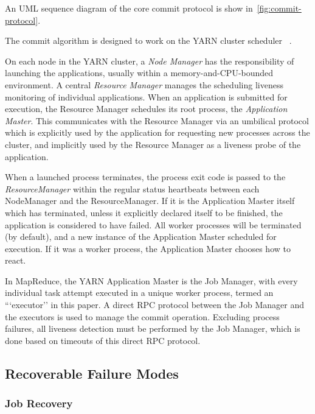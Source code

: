 \documentclass[conference]{IEEEtran}
\begin{document}
An UML sequence diagram of the core commit protocol is
show in\ \ref{fig:commit-protocol}.

The commit algorithm is designed to work on the YARN cluster scheduler
\ \cite{Vavilapalli2013}.

On each node in the YARN cluster, a \emph{Node Manager} has the responsibility
of launching the applications, usually within a memory-and-CPU-bounded
environment.
A central \emph{Resource Manager} manages the scheduling liveness monitoring
of individual applications.
When an application is submitted for execution, the Resource Manager schedules
its root process, the \emph{Application Master}.
This communicates with the Resource Manager via an umbilical protocol
which is explicitly used by the application for requesting new processes
across the cluster, and implicitly used by the Resource Manager
as a liveness probe of the application.

When a launched process terminates, the process exit code
is passed to the \emph{ResourceManager} within the regular status heartbeats
between each NodeManager and the ResourceManager.
If it is the Application Master itself which has terminated, unless it explicitly
declared itself to be finished, the application is considered to have failed.
All worker processes will be terminated (by default), and a new instance
of the Application Master scheduled for execution.
If it was a worker process, the Application Master chooses how to    react.


In MapReduce, the YARN Application Master is the Job Manager,
with every individual task attempt executed in a unique worker process, termed
an ```executor'' in this paper.
A direct RPC protocol between the Job Manager and the executors is used to manage
the commit operation.
Excluding process failures, all liveness detection must be performed by the
Job Manager, which is done based on timeouts of this direct RPC protocol.


\subsection{Recoverable Failure Modes}
\label{subsec:optionalRecoverableFailureModes}

\subsubsection{Job Recovery}
\end{document}
